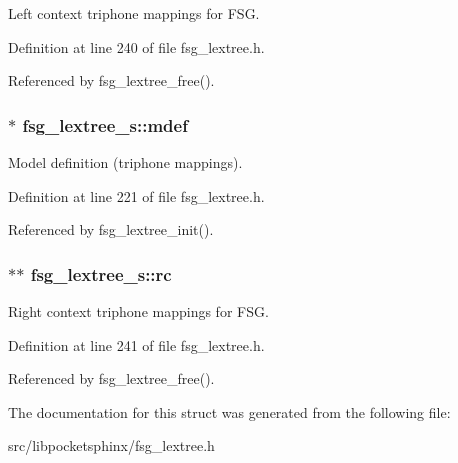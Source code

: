 \-Left context triphone mappings for \-F\-S\-G. 



\-Definition at line 240 of file fsg\-\_\-lextree.\-h.



\-Referenced by fsg\-\_\-lextree\-\_\-free().

\subsubsection[{mdef}]{$\ast$ {\bf fsg\-\_\-lextree\-\_\-s\-::mdef}}\label{structfsg__lextree__s_ae2c059413a1cb4cda7068ab30a7a477c}


\-Model definition (triphone mappings). 



\-Definition at line 221 of file fsg\-\_\-lextree.\-h.



\-Referenced by fsg\-\_\-lextree\-\_\-init().

\subsubsection[{rc}]{$\ast$$\ast$ {\bf fsg\-\_\-lextree\-\_\-s\-::rc}}\label{structfsg__lextree__s_a307d5351803d409aa51395333294c0f1}


\-Right context triphone mappings for \-F\-S\-G. 



\-Definition at line 241 of file fsg\-\_\-lextree.\-h.



\-Referenced by fsg\-\_\-lextree\-\_\-free().



\-The documentation for this struct was generated from the following file\-:\begin{DoxyCompactItemize}
\item 
src/libpocketsphinx/fsg\-\_\-lextree.\-h\end{DoxyCompactItemize}
